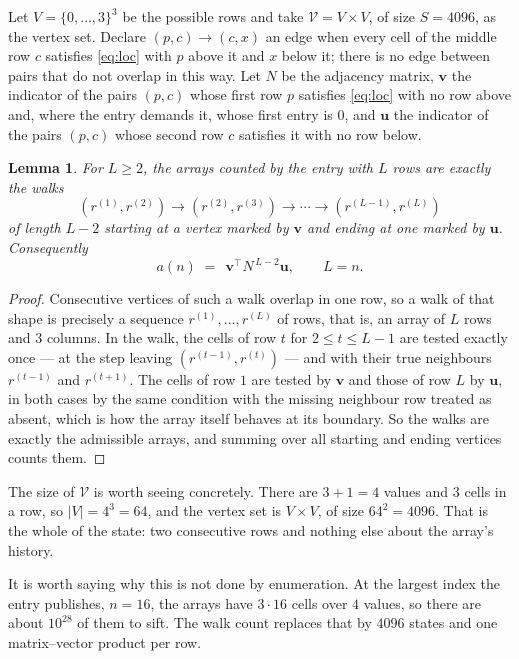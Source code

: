 \documentclass[11pt,a4paper]{article}
\theoremstyle{plain}
\newtheorem{lemma}[theorem]{Lemma}
\theoremstyle{definition}
\begin{document}
Let $V=\{0,\dots,3\}^{3}$ be the possible rows and take
$\mathcal V=V\times V$, of size $S=4096$, as the vertex set. Declare $(p,c)\to(c,x)$ an edge
when every cell of the middle row $c$ satisfies \eqref{eq:loc} with $p$ above it and $x$
below it; there is no edge between pairs that do not overlap in this way. Let $N$ be the
adjacency matrix, $\mathbf{v}$ the indicator of the pairs $(p,c)$ whose first row $p$
satisfies \eqref{eq:loc} with no row above and, where the entry demands it, whose first entry is $0$, and $\mathbf{u}$ the indicator of
the pairs $(p,c)$ whose second row $c$ satisfies it with no row below.

\begin{lemma}\label{lem:walk}
For $L\ge2$, the arrays counted by the entry with $L$ rows are exactly the walks
\[
(r^{(1)},r^{(2)})\to(r^{(2)},r^{(3)})\to\cdots\to(r^{(L-1)},r^{(L)})
\]
of length $L-2$ starting at a vertex marked by $\mathbf{v}$ and ending at one marked by
$\mathbf{u}$. Consequently
\[
a(n)\;=\;\,\mathbf{v}^{\!\top}N^{\,L-2}\mathbf{u},\qquad L=n .
\]
\end{lemma}

\begin{proof}
Consecutive vertices of such a walk overlap in one row, so a walk of that shape is
precisely a sequence $r^{(1)},\dots,r^{(L)}$ of rows, that is, an array of $L$ rows
and $3$ columns. In the walk, the cells of row $t$ for $2\le t\le L-1$ are tested
exactly once --- at the step leaving $(r^{(t-1)},r^{(t)})$ --- and with their true
neighbours $r^{(t-1)}$ and $r^{(t+1)}$. The cells of row $1$ are tested by
$\mathbf{v}$ and those of row $L$ by $\mathbf{u}$, in both cases by the same condition
with the missing neighbour row treated as absent, which is how the array itself behaves at
its boundary. So the walks are exactly the admissible arrays, and summing over all starting
and ending vertices counts them.
\end{proof}


The size of $\mathcal V$ is worth seeing concretely. There are $3+1=4$ values
and $3$ cells in a row, so $|V|=4^{3}=64$, and the vertex set is
$V\times V$, of size $64^2=4096$. That is the whole of the state: two consecutive
rows and nothing else about the array's history.

It is worth saying why this is not done by enumeration. At the largest index the entry
publishes, $n=16$, the arrays have $3\cdot16$ cells over
$4$ values, so there are about $10^{28}$ of them to sift. The
walk count replaces that by $4096$ states and one matrix--vector product per row.
\end{document}
